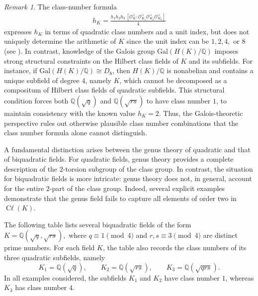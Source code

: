 \documentclass[12 pt]{amsart}
\theoremstyle{definition}
\theoremstyle{remark}
\newtheorem{remark}{Remark}
\DeclareMathOperator{\Cl}{C\ell}
\begin{document}
\begin{remark}
The class-number formula  \begin{align*}
    h_K=\frac{h_1h_2h_3\,[\mathcal{O}_K^\times:\mathcal{O}_{K_1}^\times\mathcal{O}_{K_2}^\times\mathcal{O}_{K_3}^\times]}{4}
\end{align*}
expresses $h_K$ in terms of quadratic class numbers and a unit index, but does
not uniquely determine the arithmetic of $K$ since the unit index can be
$1,2,4,$ or $8$ (see \cite{DuKi23}). In contrast, knowledge of the Galois group $\mathrm{Gal}(H(K)/\mathbb{Q})$ imposes strong structural constraints on the Hilbert class fields of $K$ and its subfields. For instance, if $\mathrm{Gal}(H(K)/\mathbb{Q}) \cong D_8$, then $H(K)/\mathbb{Q}$ is nonabelian and contains a unique subfield of degree $4$, namely $K$, which cannot be decomposed as a compositum of Hilbert class fields of quadratic subfields. This structural condition forces both $\mathbb{Q}(\sqrt{q})$ and $\mathbb{Q}(\sqrt{rs})$ to have class number $1$, to maintain consistency with the known value $h_K = 2$. Thus, the Galois-theoretic perspective rules out otherwise plausible class number combinations that the class number formula alone cannot distinguish.
\end{remark}


 A fundamental distinction arises between the genus theory of quadratic and that of biquadratic fields.
For quadratic fields, genus theory provides a complete description of the $2$-torsion subgroup of the class group.
In contrast, the situation for biquadratic fields is more intricate: genus theory does not, in general, account for the entire $2$-part of the class group.
Indeed, several explicit examples demonstrate that the genus field fails to capture all elements of order two in $\Cl(K)$.

\noindent
The following table lists several biquadratic fields of the form   $K = \mathbb{Q}(\sqrt{q}, \sqrt{rs}),$
where $ q \equiv 1 \pmod{4} $ and $ r, s \equiv 3 \pmod{4} $ are distinct prime numbers.  
For each field $ K $, the table also records the class numbers of its three quadratic subfields, namely  
\[
K_1 = \mathbb{Q}(\sqrt{q}), \qquad  
K_2 = \mathbb{Q}(\sqrt{rs}), \qquad  
K_3 = \mathbb{Q}(\sqrt{qrs}).
\]
In all examples considered, the subfields $ K_1 $ and $ K_2 $ have class number $ 1 $, whereas $ K_3 $ has class number $ 4 $.
\end{document}
